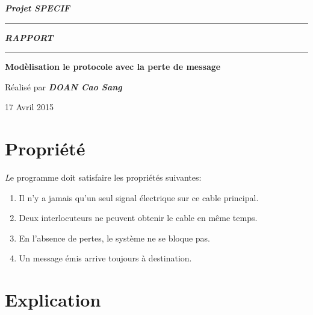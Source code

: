 \documentclass[a4paper,11pt]{report}
\begin{document}
	\begin{titlepage}
		\begin{center}
			\large\bfseries\itshape Projet SPECIF\\
		\end{center}
		\noindent\rule{\linewidth}{3pt}

		\begin{center}
			\Huge\bfseries\itshape RAPPORT\\
		\end{center}
		
		\noindent\rule{\linewidth}{3pt}
		\begin{center}
			\bfseries
			\large Modèlisation le protocole avec la perte de message
			
		\end{center}
		\begin{center}
			Réalisé par \bfseries \itshape DOAN Cao Sang
		\end{center}
		\begin{center}
			17 Avril 2015
		\end{center}
	\end{titlepage}

\chapter{Propriété}
	{\huge \itshape L}e programme doit satisfaire les propriétés suivantes:
		\begin{enumerate}
			\item Il n'y a jamais qu'un seul signal électrique sur ce cable principal.
			\item Deux interlocuteurs ne peuvent obtenir le cable en même temps.
			\item En l'absence de pertes, le système ne se bloque pas.
			\item Un message émis arrive toujours à destination.
		\end{enumerate}
	
\chapter{Explication}
\end{document}
